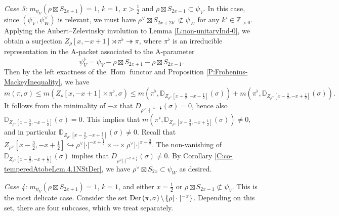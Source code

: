 \documentclass[11pt,letterpaper]{amsart}
\theoremstyle{plain}
\numberwithin{theorem}{section}
\numberwithin{equation}{subsection}
\theoremstyle{remark}
\newcommand{\Hom}{\operatorname{Hom}}
\newcommand{\D}{\mathbb{D}}
\newcommand{\Z}{\mathbb{Z}}
\def\Der{{\rm Der}} %
\begin{document}
\vskip 5pt

\emph{Case 3:} $m_{\psi_V}\left(\rho\boxtimes S_{2x+1}\right)=1$, $k=1$, $x>\frac{1}{2}$ and $\rho\boxtimes S_{2x-1}\subset \psi_V$. In this case, since $\left(\psi_V^-,\psi_W^\vee\right)$ is relevant, we must have $\rho^\vee\boxtimes S_{2x+2k'}\not\subset\psi_W$ for any $k'\in\Z_{>0}$. Applying the Aubert--Zelevinsky involution to Lemma \ref{L:non-unitaryInd-0}, we obtain a  surjection $Z_{\rho}\left[x,-x+1\right]\rtimes\pi^\flat\twoheadrightarrow\pi$, where $\pi^\flat$ is an irreducible representation in the A-packet associated to the A-parameter
\[
    \psi_V^\flat = \psi_V - \rho\boxtimes S_{2x+1} - \rho\boxtimes S_{2x-1}.
\]
Then by the left exactness of the \(\Hom\) functor and Proposition \ref{P:Frobenius-MackeyInequality}, we have
\[
    m\left(\pi,\sigma\right)\leq m\left(Z_{\rho}\left[x,-x+1\right]\rtimes\pi^\flat,\sigma\right) \leq m\left(\pi^\flat, \D_{Z_{\rho^\vee}\left[x-\frac{3}{2},-x-\frac{1}{2}\right]}\left(\sigma\right)\right) + m\left(\pi^\flat, \D_{Z_{\rho^\vee}\left[x-\frac{3}{2},-x+\frac{1}{2}\right]}\left(\sigma\right)\right).
\]
It follows from the minimality of $-x$ that $D_{\rho^\vee|\cdot|^{-x-\frac{1}{2}}}\left(\sigma\right)=0$, hence also $\D_{Z_{\rho^\vee}\left[x-\frac{3}{2},-x-\frac{1}{2}\right]}\left(\sigma\right)=0$. This implies that $m\left(\pi^\flat, \D_{Z_{\rho^\vee}\left[x-\frac{3}{2},-x+\frac{1}{2}\right]}\left(\sigma\right)\right)\neq 0$, and in particular $\D_{Z_{\rho^\vee}\left[x-\frac{3}{2},-x+\frac{1}{2}\right]}\left(\sigma\right)\neq0$. Recall that $Z_{\rho^\vee}\left[x-\frac{3}{2},-x+\frac{1}{2}\right]\hookrightarrow\rho^\vee|\cdot|^{-x+\frac{1}{2}}\times\cdots\times\rho^\vee|\cdot|^{x-\frac{3}{2}}$. The non-vanishing of $\D_{Z_{\rho^\vee}\left[x-\frac{3}{2},-x+\frac{1}{2}\right]}\left(\sigma\right)$ implies that $D_{\rho^\vee|\cdot|^{-x+\frac{1}{2}}}\left(\sigma\right)\neq0$. By Corollary \ref{C:co-temperedAtobeLem.4.1NStDer}, we have $\rho^\vee\boxtimes S_{2x}\subset\psi_W$ as desired.

\vskip 5pt

\emph{Case 4:} $m_{\psi_V}\left(\rho\boxtimes S_{2x+1}\right)=1$, $k=1$, and either $x=\frac{1}{2}$ or $\rho\boxtimes S_{2x-1}\not\subset \psi_V$. This is the most delicate case. Consider the set $\Der\left(\pi,\sigma\right)\backslash\left\{\rho|\cdot|^{-x}\right\}$. Depending on this set, there are four subcases, which we treat separately.

\vskip 5pt
\end{document}
